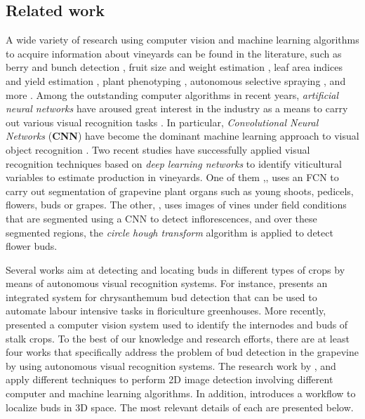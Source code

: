 \documentclass[a4paper,authoryear,review]{elsarticle}
\begin{document}
	\subsection{Related work}
	\label{sec:related}
	A wide variety of research using computer vision and machine learning algorithms to acquire information about vineyards \citep{seng2018computer} can be found in the literature, such as berry and bunch detection \citep{nuske2011yield}, fruit size and weight estimation \citep{tardaguila2012automatic}, leaf area indices and yield estimation \citep{diago2012grapevine}, plant phenotyping \citep{herzog2014objective, herzog2014initial}, autonomous selective spraying \citep{berenstein2010grape}, and more \citep{tardaguila2012applications, whalley2013applications}. Among the outstanding computer algorithms in recent years, \emph{artificial neural networks} have aroused great interest in the industry as a means to carry out various visual recognition tasks \citep{hirano2006industry, kahng2017cti, tilgner2019multi}. In particular, \emph{Convolutional Neural Networks} (\textbf{CNN}) have become the dominant machine learning approach to visual object recognition \citep{ning2017inception}. Two recent studies have successfully applied visual recognition techniques based on \emph{deep learning networks} to identify viticultural variables to estimate production in vineyards. One of them ,\citet{grimm2019adaptable}, uses an FCN to carry out segmentation of grapevine plant organs such as young shoots, pedicels, flowers, buds or grapes. The other, \citet{rudolph2018efficient}, uses images of vines under field conditions that are segmented using a CNN to detect inflorescences, and over these segmented regions, the \emph{circle hough transform} algorithm is applied to detect flower buds.
	
	Several works aim at detecting and locating buds in different types of crops by means of autonomous visual recognition systems. For instance, \citet{tarry2014integrated} presents an integrated system for chrysanthemum bud detection that can be used to automate labour intensive tasks in floriculture greenhouses. More recently, \citet{zhao2018research} presented a   computer  vision system used to  identify the  internodes and  buds  of  stalk  crops. To the best of our knowledge and research efforts, there are at least four works that specifically address the problem of bud detection in the grapevine by using autonomous visual recognition systems. The research work by \citet{xu2014detection}, \citet{herzog2014initial} and \citet{perez2017image} apply different techniques to perform 2D image detection involving different computer and machine learning algorithms. In addition, \citet{diaz2018grapevine} introduces a workflow to localize buds in 3D space. The most relevant details of each are presented below.
	
\end{document}
